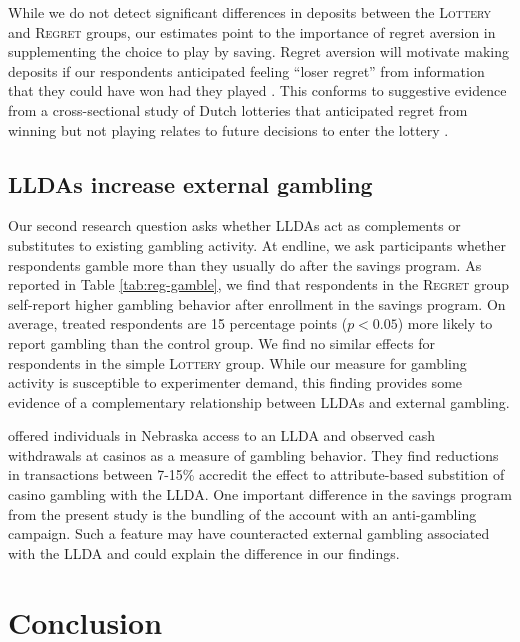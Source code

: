 \documentclass[11pt]{article}
\begin{document}
		While we do not detect significant differences in deposits between the \textsc{Lottery} and \textsc{Regret} groups, our estimates point to the importance of regret aversion in supplementing the choice to play by saving. Regret aversion will motivate making deposits if our respondents anticipated feeling ``loser regret'' from information that they could have won had they played . This conforms to suggestive evidence from a cross-sectional study of Dutch lotteries that anticipated regret from winning but not playing relates to future decisions to enter the lottery .

	\subsection{LLDAs increase external gambling}

		Our second research question asks whether LLDAs act as complements or substitutes to existing gambling activity. At endline, we ask participants whether respondents gamble more than they usually do after the savings program. As reported in Table \ref{tab:reg-gamble}, we find that respondents in the \textsc{Regret} group self-report higher gambling behavior after enrollment in the savings program. On average, treated respondents are 15 percentage points ($p < 0.05$) more likely to report gambling than the control group. We find no similar effects for respondents in the simple \textsc{Lottery} group. While our measure for gambling activity is susceptible to experimenter demand, this finding provides some evidence of a complementary relationship between LLDAs and external gambling.

		 offered individuals in Nebraska access to an LLDA and observed cash withdrawals at casinos as a measure of gambling behavior. They find reductions in transactions between 7-15\% accredit the effect to attribute-based substition of casino gambling with the LLDA. One important difference in the savings program from the present study is the bundling of the account with an anti-gambling campaign. Such a feature may have counteracted external gambling associated with the LLDA and could explain the difference in our findings.

\section{Conclusion} \label{sec:conclusion}
\end{document}
